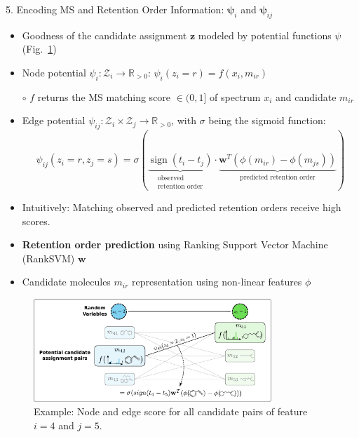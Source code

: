 \documentclass{beamer}
\newcommand{\ms}{MS}
\DeclareMathOperator{\sign}{sign}
\begin{document}
\begin{frame}{}
\begin{columns}[T]
    \begin{block}{{\normalsize 5. Encoding \ms{} and Retention Order Information: $\boldsymbol{\psi}_i$ and $\boldsymbol{\psi}_{ij}$}}
    \begin{itemize}
        \item Goodness of the candidate assignment $\mathbf{z}$ modeled by potential functions $\psi$ (Fig.~\ref{fig:node_and_edge_potentials})
        \item Node potential $\psi_i:\mathcal{Z}_i\rightarrow\mathbb{R}_{>0}$: $\psi_i(z_i=r)=f(x_i,m_{ir})$
        \item[$\circ$] $f$ returns the \ms{} matching score $\in(0,1]$ of spectrum $x_i$ and candidate $m_{ir}$
        \item Edge potential $\psi_{ij}:\mathcal{Z}_i\times\mathcal{Z}_j\rightarrow\mathbb{R}_{>0}$, with $\sigma$ being the sigmoid function:
            \begin{equation}
                \psi_{ij}(z_i=r,z_j=s)=\sigma(\underbrace{\sign(t_i-t_j)}_{\substack{\text{observed}\\ \text{retention order}}}\cdot\underbrace{\mathbf{w}^T(\phi(m_{ir})-\phi(m_{js}))}_{\text{predicted retention order}})
            \end{equation}
        \item Intuitively: Matching observed and predicted retention orders receive high scores.
        \item \textbf{Retention order prediction} using Ranking Support Vector Machine (RankSVM) $\mathbf{w}$ \cite{Bach2018}
        \item Candidate molecules $m_{ir}$ representation using non-linear features $\phi$ 
    \end{itemize}
    \vspace{0.25cm}
    \begin{figure}
        \centering
        \includegraphics[width=0.8\textwidth]{images/node_and_edge_scores.pdf}
        \caption{Example: Node and edge score for all candidate pairs of feature $i=4$ and $j=5$.}
        \label{fig:node_and_edge_potentials}
    \end{figure}
    \vspace{-0.75cm}
    \end{block}



\end{columns}
\end{frame}
\end{document}
